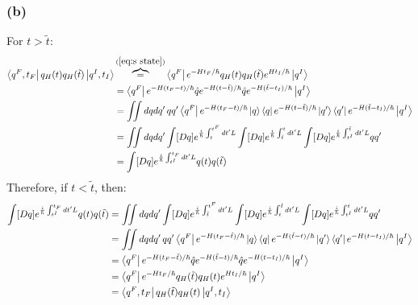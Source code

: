 \documentclass{article}
\begin{document}
\subsubsection*{(b)}
For $t>\tilde{t}$:\\
\begin{equation*}
\begin{split}
    \bra{q^F,t_F}q_H(t)q_H(\tilde t)\ket{q^I,t_I} & \overbrace{=}^{(\ref{eq:s state})} 
    \bra{q^F}e^{-Ht_F/\hbar}q_H(t)q_H(\tilde t)e^{Ht_I/\hbar}\ket{q^I}\\
    & = \bra{q^F}e^{-H(t_F-t)/\hbar}\hat q e^{-H(t-\tilde t)/\hbar}\hat qe^{-H(\tilde t - t_I)/\hbar}\ket{q^I}\\
    & = \iint dqdq'\,qq'\bra{q^F}e^{-H(t_F-t)/\hbar}\ket{q}\bra{q}e^{-H(t-\tilde t)/\hbar}\ket{q'}\bra{q'}e^{-H(\tilde t - t_I)/\hbar}\ket{q^I}\\
    & =\iint dq dq' \int [Dq] e^{\frac{i}{\hbar}\int_{t}^{t^F}dt'L}\int [Dq] e^{\frac{i}{\hbar}\int_{\tilde t}^{t}dt'L}\int [Dq] e^{\frac{i}{\hbar}\int_{t^I}^{\tilde t}dt'L}qq'\\
    & =\int [Dq] e^{\frac{i}{\hbar}\int_{t^I}^{t_F}dt'L}q(t)q(\tilde t)
\end{split}
\end{equation*}
Therefore, if $t < \tilde t$, then:
\begin{equation*}
    \begin{split}
       \int [Dq] e^{\frac{i}{\hbar}\int_{t^I}^{t_F}dt'L}q(t)q(\tilde t) & =
       \iint dq dq' \int [Dq] e^{\frac{i}{\hbar}\int_{\tilde t}^{t^F}dt'L}\int [Dq] e^{\frac{i}{\hbar}\int_{t}^{\tilde t}dt'L}\int [Dq] e^{\frac{i}{\hbar}\int_{t^I}^{t}dt'L}qq'\\
       & = \iint dqdq'\,qq'\bra{q^F}e^{-H(t_F-\tilde t)/\hbar}\ket{q}\bra{q}e^{-H(\tilde t- t)/\hbar}\ket{q'}\bra{q'}e^{-H( t - t_I)/\hbar}\ket{q^I}\\
       & = \bra{q^F}e^{-H(t_F-\tilde t)/\hbar}\hat q e^{-H(\tilde t-t)/\hbar}\hat qe^{-H(t - t_I)/\hbar}\ket{q^I}\\
       & = \bra{q^F}e^{-Ht_F/\hbar}q_H(\tilde t)q_H(t)e^{Ht_I/\hbar}\ket{q^I}\\
       & = \bra{q^F,t_F}q_H(\tilde t)q_H(t)\ket{q^I,t_I}
    \end{split}
\end{equation*}
\end{document}
